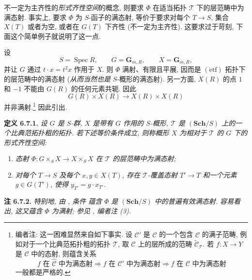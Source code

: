 不一定为主齐性的\emph{形式齐性空间}的概念, 则要求 \(\Phi\)
在适当拓扑 \(\mathcal T\) 下的层范畴中为满态射.
事实上, 要求 \(\Phi\) 为 \(S\)-函子的满态射,
等价于要求对每个 \(T\to S\), 集合 \(X(T)\) 或者为空,
或者在 \(G(T)\) 下齐性 (不一定为主齐性).
这要求过于苛刻, 下面这个简单例子就说明了这一点.

设
\[
  S=\operatorname{Spec}R,\qquad G=\mathbf G_{m,R},\qquad
  X=\mathbf G_{m,R},
\]
并让 \(G\) 通过 \(t\cdot x=t^2x\) 作用于 \(X\).
则 \(\Phi\) 满射、有限且平展, 因而是 \((\mathrm{\acute etf})\)
拓扑下的层范畴中的满态射 (\textit{从而当然也是} \(S\)-概形的满态射).
另一方面, \(X(R)\) 的点 \(1\) 和 \(-1\) 不能由 \(G(R)\) 的任何元素共轭.
因此
\[
  G(R)\times X(R)\longrightarrow X(R)\times X(R)
\]
并非满射.\footnote{编者注: 这一困难显然来自如下事实.
设 \(\mathscr C'\) 是 \(\widehat{\mathscr C}\) 的一个包含 \(\mathscr C\) 的满子范畴,
例如对于一个比典范拓扑粗的拓扑 \(\mathcal T\),
取 \(\mathscr C\) 上的层所成的范畴
\(\widetilde{\mathscr C}_{\mathcal T}\).
若 \(f:X\to Y\) 是 \(\mathscr C\) 中的态射, 则蕴含关系
\[
 \text{\(f\) 在 \(\widehat{\mathscr C}\) 中为满态射}
 \Longrightarrow
 \text{\(f\) 在 \(\mathscr C'\) 中为满态射}
 \Longrightarrow
 \text{\(f\) 在 \(\mathscr C\) 中为满态射}
\]
一般都是严格的.}
因此引出.

\medskip
\noindent{}\textbf{定义 6.7.1.}
\textit{设 \(G\) 是 \(S\)-群, \(X\) 是带有 \(G\) 作用的 \(S\)-概形,
\(\mathcal T\) 是 \((\mathbf{Sch}/S)\) 上的一个比典范拓扑粗的拓扑.
若下述等价条件成立, 则称概形 \(X\) 为相对于 \(\mathcal T\) 的
\emph{\(G\) 下的形式齐性空间}:}
\begin{enumerate}
  \item[(i)] \textit{态射
    \(\Phi:G\times_SX\to X\times_SX\) 在 \(\mathcal T\) 的层范畴中为满态射;}
  \item[(ii)] \textit{对每个 \(T\to S\)
    及每个 \(x,y\in X(T)\), 存在 \(\mathcal T\)-覆盖态射 \(T'\to T\)
    和一个元素 \(g\in G(T')\), 使得 \(y_{T'}=g\cdot x_{T'}\).}
\end{enumerate}

\medskip
\noindent{}\textbf{注 6.7.2.}
\textit{特别地, 由 ,
条件  蕴含
\(\Phi\) 是 \((\mathbf{Sch}/S)\) 中的普遍有效满态射.
容易看出, 这又蕴含 \(\Phi\) 为满射;
参见 , 编者注 (3).}

